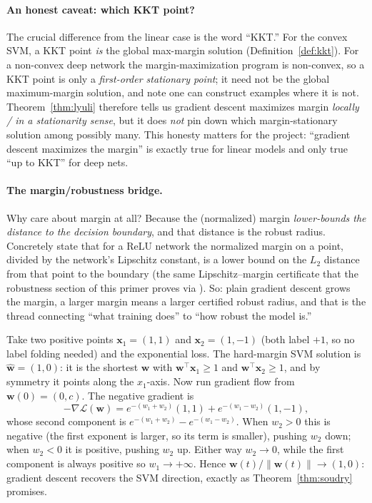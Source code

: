 \paragraph{An honest caveat: which KKT point?}
The crucial difference from the linear case is the word ``KKT.'' For the
convex SVM, a KKT point \emph{is} the global max-margin solution
(Definition~\ref{def:kkt}). For a non-convex deep network the
margin-maximization program is non-convex, so a KKT point is only a
\emph{first-order stationary point}; it need not be the global
maximum-margin solution, and \citet{lyuli2020} note one can construct
examples where it is not. Theorem~\ref{thm:lyuli} therefore tells us
gradient descent maximizes margin \emph{locally / in a stationarity
sense}, but it does \emph{not} pin down which margin-stationary solution
among possibly many. This honesty matters for the project: ``gradient
descent maximizes the margin'' is exactly true for linear models and only
true ``up to KKT'' for deep nets.

\paragraph{The margin/robustness bridge.}
Why care about margin at all? Because the (normalized) margin
\emph{lower-bounds the distance to the decision boundary}, and that
distance is the robust radius. Concretely \citet{lyuli2020} state that for
a ReLU network the normalized margin on a point, divided by the network's
Lipschitz constant, is a lower bound on the $L_2$ distance from that point
to the boundary (the same Lipschitz--margin certificate that the
robustness section of this primer proves via \citet{tsuzuku2018lipschitz}).
So: plain gradient descent grows the margin, a larger margin means a larger
certified robust radius, and that is the thread connecting ``what training
does'' to ``how robust the model is.''

\begin{example}
\label{ex:gd2d}
Take two positive points $\mathbf{x}_1=(1,1)$ and $\mathbf{x}_2=(1,-1)$
(both label $+1$, so no label folding needed) and the exponential loss.
The hard-margin SVM solution is $\widehat{\mathbf{w}}=(1,0)$: it is the
shortest $\mathbf{w}$ with $\mathbf{w}^\top\mathbf{x}_1\ge1$ and
$\mathbf{w}^\top\mathbf{x}_2\ge1$, and by symmetry it points along the
$x_1$-axis. Now run gradient flow from $\mathbf{w}(0)=(0,c)$. The negative
gradient is
\[
  -\nabla\mathcal{L}(\mathbf{w})
  = e^{-(w_1+w_2)}(1,1) + e^{-(w_1-w_2)}(1,-1),
\]
whose second component is $e^{-(w_1+w_2)} - e^{-(w_1-w_2)}$. When $w_2>0$
this is negative (the first exponent is larger, so its term is smaller),
pushing $w_2$ down; when $w_2<0$ it is positive, pushing $w_2$ up. Either
way $w_2\to0$, while the first component is always positive so $w_1\to
+\infty$. Hence $\mathbf{w}(t)/\|\mathbf{w}(t)\|\to(1,0)$: gradient descent
recovers the SVM direction, exactly as Theorem~\ref{thm:soudry} promises.
\end{example}

